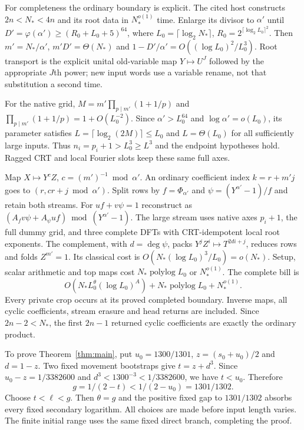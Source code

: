 \documentclass[11pt]{article}
\newcommand{\Oh}{O}
\begin{document}
For completeness the ordinary boundary is explicit. The cited host
constructs $2n<N_*<4n$ and its root data in $N_*^{o(1)}$ time. Enlarge
its divisor to $\alpha'$ until $D'=\varphi(\alpha')\ge(R_0+L_0+5)^{64}$,
where $L_0=\lceil\log_2N_*\rceil$, $R_0=2^{\lceil\log_2L_0\rceil^2}$.
Then $m'=N_*/\alpha'$, $m'D'=\Theta(N_*)$ and
$1-D'/\alpha'=\Oh((\log L_0)^2/L_0^3)$. Root transport is the explicit
unital old-variable map $Y\mapsto U^J$ followed by the appropriate
$J$th power; new input words use a variable rename, not that substitution
a second time.

For the native grid, $M=m'\prod_{p\mid m'}(1+1/p)$ and
$\prod_{p\mid m'}(1+1/p)=1+\Oh(L_0^{-2})$. Since
$\alpha'>L_0^{64}$ and $\log\alpha'=o(L_0)$, its parameter satisfies
$L=\lceil\log_2(2M)\rceil\le L_0$ and $L=\Theta(L_0)$ for all sufficiently
large inputs. Thus $n_i=p_i+1>L_0^3\ge L^3$ and the endpoint hypotheses
hold. Ragged CRT and local Fourier slots keep these same full axes.

Map $X\mapsto Y^cZ$, $c=(m')^{-1}\bmod\alpha'$. An ordinary coefficient
index $k=r+m'j$ goes to $(r,cr+j\bmod\alpha')$. Split rows by
$f=\Phi_{\alpha'}$ and $\psi=(Y^{\alpha'}-1)/f$ and retain both streams.
For $uf+v\psi=1$ reconstruct as
$(A_fv\psi+A_\psi uf)\bmod(Y^{\alpha'}-1)$. The large stream uses
native axes $p_i+1$, the full dummy grid, and three complete DFTs with
CRT-idempotent local root exponents. The complement, with
$d=\deg\psi$, packs $Y^jZ^i\mapsto T^{2di+j}$, reduces rows and folds
$Z^{m'}=1$. Its classical cost is $\Oh(N_*(\log L_0)^3/L_0)=o(N_*)$.
Setup, scalar arithmetic and top maps cost $N_*\operatorname{polylog}L_0$
or $N_*^{o(1)}$. The complete bill is
\[\Oh(N_*L_0^\theta(\log L_0)^A)+N_*\operatorname{polylog}L_0+N_*^{o(1)}.
\]
Every private crop occurs at its proved completed boundary. Inverse
maps, all cyclic coefficients, stream erasure and head returns are
included. Since $2n-2<N_*$, the first $2n-1$ returned cyclic coefficients
are exactly the ordinary product.

To prove Theorem~\ref{thm:main}, put $u_0=1300/1301$,
$z=(s_0+u_0)/2$ and $d=1-z$. Two fixed movement bootstraps give
$t=z+d^3$. Since $u_0-z=1/3382600$ and
$d^3<1300^{-3}<1/3382600$, we have $t<u_0$. Therefore
\[g=1/(2-t)<1/(2-u_0)=1301/1302.\]
Choose $t<\ell<g$. Then $\theta=g$ and the positive fixed gap to
$1301/1302$ absorbs every fixed secondary logarithm. All choices are
made before input length varies. The finite initial range uses the
same fixed direct branch, completing the proof.
\end{document}
